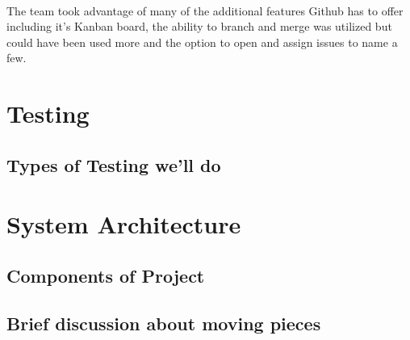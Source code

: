 \paragraph{}
The team took advantage of many of the additional features Github has to offer including it's Kanban board, the ability to branch and merge was utilized but could have been used more and the option to open and assign issues to name a few.

\section{Testing}
\subsection{Types of Testing we'll do}

\section{System Architecture}
\subsection{Components of Project}
\subsection{Brief discussion about moving pieces}



